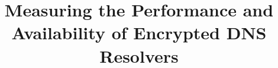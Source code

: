 \documentclass[]{llncs}
\begin{document}
\title{Measuring the Performance and Availability of Encrypted DNS Resolvers}
\author{}


\maketitle

\begin{sloppypar}






\label{lastpage}

\pagebreak



\end{sloppypar}
\end{document}
